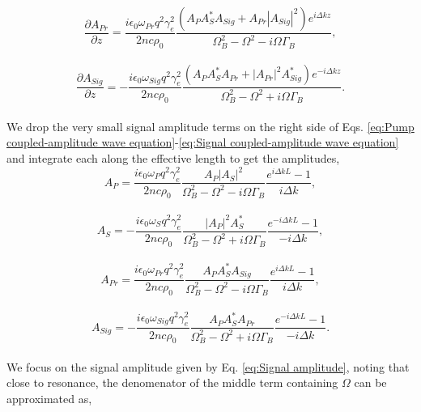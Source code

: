 \documentclass[%
  reprint,
  superscriptaddress,
  amsmath,amssymb,
  aps,
  prapplied,
]{revtex4-2}
\begin{document}
\begin{equation}
    \frac{\partial A_{Pr}}{\partial z} = \frac{i\epsilon_{0}\omega_{Pr} q^{2}\gamma_{e}^{2}}{2nc\rho_{0}}\frac{(A_{P}A_{S}^{*}A_{Sig} + A_{Pr}|A_{Sig}|^{2})e^{i\Delta kz}}{\Omega_{B}^{2} - \Omega^{2} - i\Omega\Gamma_{B}},
\end{equation}
\\
\begin{equation}
    \frac{\partial A_{Sig}}{\partial z} = -\frac{i\epsilon_{0}\omega_{Sig} q^{2}\gamma_{e}^{2}}{2nc\rho_{0}}\frac{(A_{P}A_{S}^{*}A_{Pr} + |A_{Pr}|^{2}A_{Sig}^{*})e^{-i\Delta kz}}{\Omega_{B}^{2} - \Omega^{2} + i\Omega\Gamma_{B}}.
    \label{eq:Signal coupled-amplitude wave equation}
\end{equation}
\\
We drop the very small signal amplitude terms on the right side of Eqs. \ref{eq:Pump coupled-amplitude wave equation}-\ref{eq:Signal coupled-amplitude wave equation} and integrate each along the effective length to get the amplitudes,
\\
\begin{equation}
  A_{P} = \frac{i\epsilon_{0}\omega_{P}q^{2}\gamma_{e}^{2}}{2nc\rho_{0}}\frac{A_{P}|A_{S}|^{2}}{\Omega_{B}^{2} - \Omega^{2} - i\Omega\Gamma_{B}} \frac{e^{i\Delta kL} - 1}{i\Delta k},
\end{equation}
\\
\begin{equation}
  A_{S} = -\frac{i\epsilon_{0}\omega_{S}q^{2}\gamma_{e}^{2}}{2nc\rho_{0}}\frac{|A_{P}|^{2}A_{S}^{*}}{\Omega_{B}^{2} - \Omega^{2} + i\Omega\Gamma_{B}} \frac{e^{-i\Delta kL} - 1}{-i\Delta k},
\end{equation}
\\
\begin{equation}
  A_{Pr} = \frac{i\epsilon_{0}\omega_{Pr}q^{2}\gamma_{e}^{2}}{2nc\rho_{0}}\frac{A_{P}A_{S}^{*}A_{Sig}}{\Omega_{B}^{2} - \Omega^{2} - i\Omega\Gamma_{B}} \frac{e^{i\Delta kL} - 1}{i\Delta k},
\end{equation}
\\
\begin{equation}
  A_{Sig} = -\frac{i\epsilon_{0}\omega_{Sig}q^{2}\gamma_{e}^{2}}{2nc\rho_{0}}\frac{A_{P}A_{S}^{*}A_{Pr}}{\Omega_{B}^{2} - \Omega^{2} + i\Omega\Gamma_{B}} \frac{e^{-i\Delta kL} - 1}{-i\Delta k}.
  \label{eq:Signal amplitude}
\end{equation}
\\
We focus on the signal amplitude given by Eq. \ref{eq:Signal amplitude}, noting that close to resonance, the denomenator of the middle term containing $\Omega$ can be approximated as,
\end{document}
